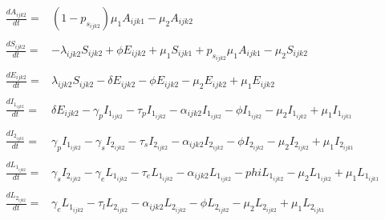 \documentclass[a4paper]{article}
\begin{document}
 \begin{equation*}\label{agecat2-1}
 \begin{aligned}
 	\frac{dA_{ijk2}}{dt}={} & (1-p_{s_{ijk2}} )\mu_1 A_{ijk1}  - \mu_2 A_{ijk2} 
     \\&\\
    \frac{dS_{ijk2}}{dt}={} & -\lambda_{ijk2} S_{ijk2} + \phi E_{ijk2} + \mu_1 S_{ijk1} + p_{s_{ijk2}} \mu_1 A_{ijk1} - \mu_2 S_{ijk2}
 \\&\\
  \frac{dE_{ijk2}}{dt}={} & \lambda_{ijk2} S_{ijk2} - \delta E_{ijk2} -\phi E_{ijk2} - \mu_2 E_{ijk2} +  \mu_1 E_{ijk2}
     \\&\\
  \frac{dI_{1_{ijk2}}}{dt}={} & \delta E_{ijk2} - \gamma_p I_{1_{ijk2}} - \tau_p I_{1_{ijk2}} - \alpha_{ijk2} I_{1_{ijk2}} -\phi  I_{1_{ijk2}} - \mu_2 I_{1_{ijk2}} + \mu_1 I_{1_{ijk1}}
   \\&\\
  \frac{dI_{2_{ijk2}}}{dt}={} & \gamma_p I_{1_{ijk2}} - \gamma_s I_{2_{ijk2}} - \tau_s I_{2_{ijk2}} - \alpha_{ijk2} I_{2_{ijk2}} -\phi I_{2_{ijk2}} - \mu_2 I_{2_{ijk2}} + \mu_1 I_{2_{ijk1}}
     \\&\\
   \frac{dL_{1_{ijk2}}}{dt}={} & \gamma_s I_{2_{ijk2}} - \gamma_e L_{1_{ijk2}} - \tau_e L_{1_{ijk2}} - \alpha_{ijk2} L_{1_{ijk2}} -phi L_{1_{ijk2}}  - \mu_2 L_{1_{ijk2}} + \mu_1 L_{1_{ijk1}}
     \\&\\
    \frac{dL_{2_{ijk2}}}{dt}={} & \gamma_e L_{1_{ijk2}} - \tau_l L_{2_{ijk2}} - \alpha_{ijk2} L_{2_{ijk2}} - \phi L_{2_{ijk2}}  - \mu_2 L_{2_{ijk2}} + \mu_1 L_{2_{ijk1}}
 \end{aligned}
 	\end{equation*}
\end{document}
